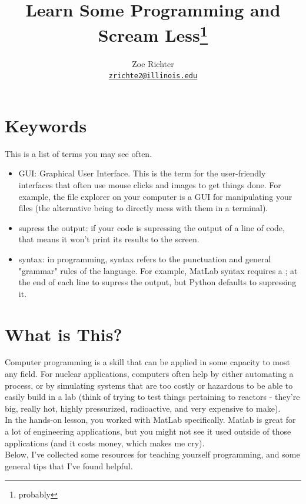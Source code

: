 \documentclass[letterpaper]{article}
\author{Zoe Richter
        \\ \href{mailto:zrichte2@illinois.edu}{\texttt{zrichte2@illinois.edu}}
}
\title{Learn Some Programming and Scream Less\thanks{probably}}
\begin{document}
\maketitle

\section{Keywords}

This is a list of terms you may see often.

\begin{itemize}
\item GUI: Graphical User Interface.  This is the term for the user-friendly interfaces that often use mouse clicks and images to get things done.  For example, the file explorer on your computer is a GUI for manipulating your files (the alternative being to directly mess with them in a terminal).
\item supress the output: if your code is supressing the output of a line of code, that means it won't print its results to the screen.
\item syntax: in programming, syntax refers to the punctuation and general "grammar" rules of the language.  For example, MatLab syntax requires a ; at the end of each line to supress the output, but Python defaults to supressing it.


\end{itemize}

\section{What is This?}

Computer programming is a skill that can be applied in some capacity to most any field.  For nuclear applications, computers often help by either automating a process, or by simulating systems that are too costly or hazardous to be able to easily build in a lab (think of trying to test things pertaining to reactors - they're big, really hot, highly pressurized, radioactive, and very expensive to make).\\

In the hands-on lesson, you worked with MatLab specifically.  Matlab is great for a lot of engineering applications, but you might not see it used outside of those applications (and it costs money, which makes me cry).\\

Below, I've collected some resources for teaching yourself programming, and some general tips that I've found helpful.
\end{document}
